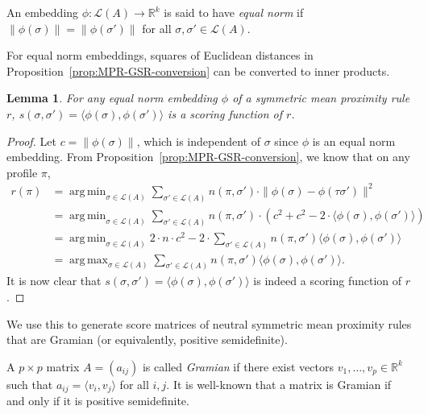 \documentclass[10pt,letterpaper]{article}
\newcommand{\calL}{{\mathcal{L}}}
\newcommand{\rank}{{\calL(A)}}
\DeclareMathOperator*{\argmax}{arg\,max}
\DeclareMathOperator*{\argmin}{arg\,min}
\newtheorem{lemma}{Lemma}
\newenvironment{definition}[1][Definition]{\begin{trivlist}
\item[\hskip \labelsep {\bfseries #1}]}{\end{trivlist}}
\begin{document}
\begin{definition}[Equal Norm Embedding]
An embedding $\phi : \rank \rightarrow \mathbb{R}^k$ is said to have \emph{equal norm} if $\|\phi(\sigma)\| = \|\phi(\sigma')\|$ for all $\sigma,\sigma' \in \rank$.
\end{definition}

For equal norm embeddings, squares of Euclidean distances in Proposition~\ref{prop:MPR-GSR-conversion} can be converted to inner products.
\begin{lemma}
For any equal norm embedding $\phi$ of a symmetric mean proximity rule $r$, $s(\sigma,\sigma') = \langle \phi(\sigma),\phi(\sigma') \rangle$ is a scoring function of $r$. 
\label{lem:inner-product}
\end{lemma}
\begin{proof}
Let $c = \|\phi(\sigma)\|$, which is independent of $\sigma$ since $\phi$ is an equal norm embedding. From Proposition~\ref{prop:MPR-GSR-conversion}, we know that on any profile $\pi$, 
\begin{align*}
r(\pi) &= \argmin_{\sigma \in \rank} \sum_{\sigma' \in \rank} n(\pi,\sigma') \cdot \|\phi(\sigma)-\phi(\tau \sigma')\|^2 \\
&= \argmin_{\sigma \in \rank} \sum_{\sigma' \in \rank} n(\pi,\sigma') \cdot \left( c^2 + c^2 - 2 \cdot \langle \phi(\sigma), \phi(\sigma')\rangle\right) \\
&= \argmin_{\sigma \in \rank} 2 \cdot n \cdot c^2 - 2 \cdot \sum_{\sigma' \in \rank} n(\pi,\sigma') \langle \phi(\sigma), \phi(\sigma')\rangle \\
&= \argmax_{\sigma \in \rank} \sum_{\sigma' \in \rank} n(\pi,\sigma') \langle \phi(\sigma), \phi(\sigma')\rangle.
\end{align*}
It is now clear that $s(\sigma,\sigma') = \langle \phi(\sigma),\phi(\sigma') \rangle$ is indeed a scoring function of $r$. 
\end{proof}

We use this to generate score matrices of neutral symmetric mean proximity rules that are Gramian (or equivalently, positive semidefinite).
\begin{definition}[Gramian Matrix]
A $p \times p$ matrix $A = (a_{ij})$ is called \emph{Gramian} if there exist vectors $v_1,\ldots,v_p \in \mathbb{R}^k$ such that $a_{ij} = \langle v_i,v_j \rangle$ for all $i,j$. It is well-known that a matrix is Gramian if and only if it is positive semidefinite. 
\end{definition}
\end{document}
